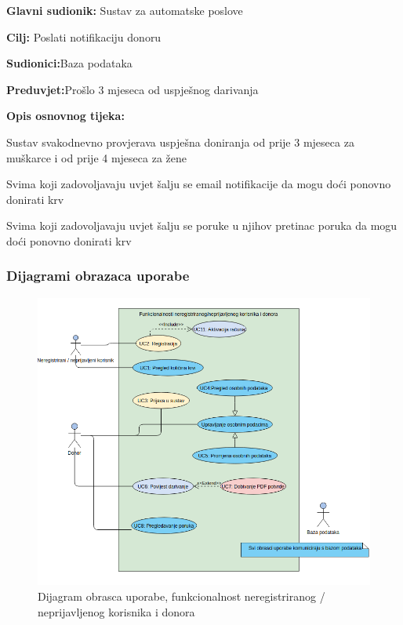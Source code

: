 \begin{packed_item}
	
	\item \textbf{Glavni sudionik: }{Sustav za automatske poslove}
	\item  \textbf{Cilj:} {Poslati notifikaciju donoru}
	\item  \textbf{Sudionici:}{Baza podataka}
	\item  \textbf{Preduvjet:}{Prošlo 3 mjeseca od uspješnog darivanja}
	\item  \textbf{Opis osnovnog tijeka:}
	
	\item[] \begin{packed_enum}
		
		\item {Sustav svakodnevno provjerava uspješna doniranja od prije 3 mjeseca za muškarce i od prije 4 mjeseca za žene}
		\item {Svima koji zadovoljavaju uvjet šalju se email notifikacije da mogu doći ponovno donirati krv}
		\item {Svima koji zadovoljavaju uvjet šalju se poruke u njihov pretinac poruka da mogu doći ponovno donirati krv}
		
	\end{packed_enum}
	
\end{packed_item}


\subsubsection{Dijagrami obrazaca uporabe}
\begin{figure}[H]
			\includegraphics[scale=0.6]{dijagrami/Funkcionalnosti_korisnika_donora.png} %
			\centering
			\caption{Dijagram obrasca uporabe, funkcionalnost neregistriranog / neprijavljenog korisnika i donora}
			\label{fig:Funkcionalnosti_korisnika_donora}
\end{figure}

